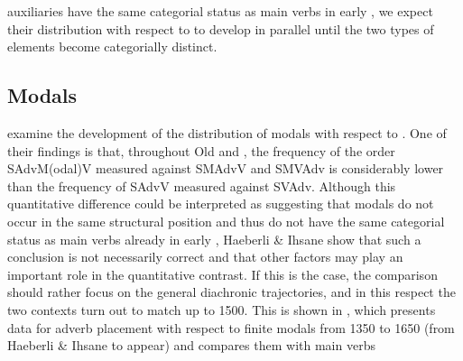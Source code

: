 \documentclass[output=paper]{langsci/langscibook}
\begin{document}
auxiliaries have the same categorial status as main verbs in early , we
expect their distribution with respect to  to develop in parallel until
the two types of elements become categorially distinct.

\subsection{Modals}

\textcite{HaeIhsta} examine the development of the distribution of
modals with respect to . One of their findings is that, throughout Old
and , the frequency of the order SAdvM(odal)V measured against
SMAdvV and SMVAdv is considerably lower than the frequency of SAdvV measured
against SVAdv. Although this quantitative difference could be interpreted as
suggesting that modals do not occur in the same structural position and thus do
not have the same categorial status as main verbs already in early ,
Haeberli \& Ihsane show that such a conclusion is not necessarily correct and
that other factors may play an important role in the quantitative contrast. If
this is the case, the comparison should rather focus on the general diachronic
trajectories, and in this respect the two contexts turn out to match up to
1500. This is shown in , which presents data for adverb
placement with respect to finite modals from 1350 to 1650 (from Haeberli \&
Ihsane to appear) and compares them \newpage \noindent with main verbs
\end{document}
